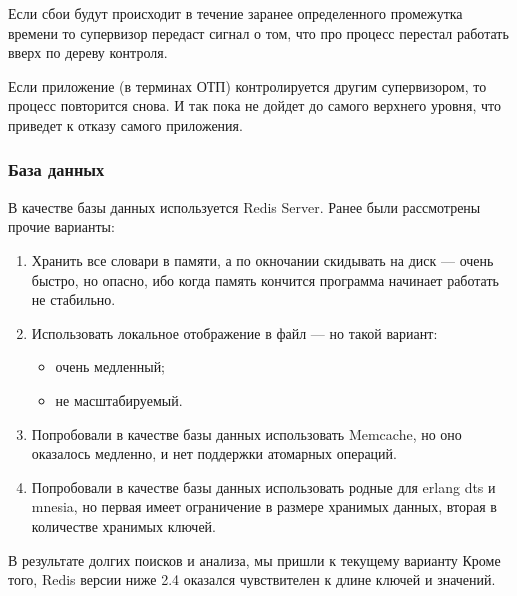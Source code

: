 Если сбои будут происходит 
в течение заранее определенного промежутка времени то супервизор 
передаст сигнал о том, что про процесс перестал работать вверх 
по дереву контроля.

Если приложение (в терминах ОТП) контролируется другим супервизором, то процесс повторится снова.
И так пока не дойдет до самого верхнего уровня, что приведет к отказу самого приложения.

\subsubsection{База данных}

В качестве базы данных используется Redis Server.
Ранее были рассмотрены прочие варианты:
\begin{enumerate}
	\item Хранить все словари в памяти, а по окночании скидывать на диск --- очень 
		быстро, но опасно, ибо когда память кончится программа начинает работать не стабильно.
	\item Использовать локальное отображение в файл --- но такой вариант:
	\begin{itemize}
		\item очень медленный;
		\item не масштабируемый.
	\end{itemize}
	\item Попробовали в качестве базы данных использовать Memcache, но оно оказалось 
	медленно, и нет поддержки атомарных операций.
	\item Попробовали в качестве базы данных использовать родные для erlang dts и mnesia, 
		но первая имеет ограничение в размере хранимых данных,
		вторая в количестве хранимых ключей.
\end{enumerate}
В результате долгих поисков и анализа, мы пришли к текущему варианту
Кроме того, Redis версии ниже 2.4 оказался чувствителен к длине ключей и значений. 

